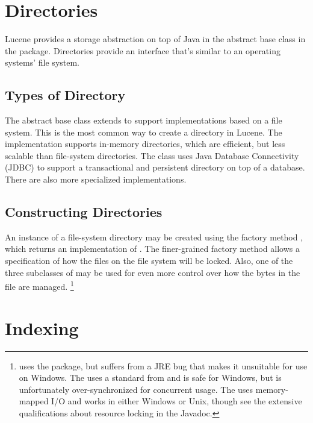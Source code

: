 \section{Directories}\label{section:lucene-directory}

Lucene provides a storage abstraction on top of Java in the abstract
base class  in the 
package.  Directories provide an interface that's similar to an
operating systems' file system.

\subsection{Types of Directory}

The  abstract base class extends  to
support implementations based on a file system.  This is the most
common way to create a directory in Lucene.  The implementation
 supports in-memory directories, which are efficient,
but less scalable than file-system directories.  The 
class uses Java Database Connectivity (JDBC) to support a transactional
and persistent directory on top of a database.  There are also more
specialized implementations.

\subsection{Constructing Directories}

An instance of a file-system directory may be created using the
factory method , which returns an
implementation of .  The finer-grained factory
method  allows a specification of how the
files on the file system will be locked.  Also, one of the three
subclasses of  may be used for even more control
over how the bytes in the file are managed.%
%
\footnote{ uses the  package, but
  suffers from a JRE bug that makes it unsuitable for use on Windows.
  The  uses a standard 
  from  and is safe for Windows, but is unfortunately
  over-synchronized for concurrent usage.  The 
  uses memory-mapped I/O and works in either Windows or Unix, though
  see the extensive qualifications about resource locking in the
  Javadoc.}


\section{Indexing}

